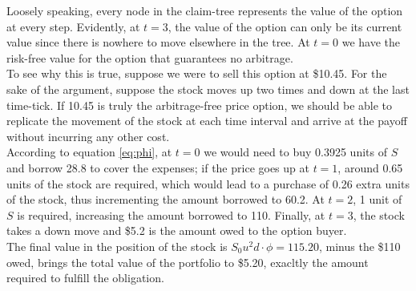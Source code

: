 \documentclass[../TGMAFFIRO.tex]{subfiles}
\begin{document}
Loosely speaking, every node in the claim-tree represents the value of the option at every step. Evidently, at $t=3$, the value of the option can only be its current value since there is nowhere to move elsewhere in the tree. At $t=0$ we have the risk-free value for the option that guarantees no arbitrage.\\

To see why this is true, suppose we were to sell this option at \$10.45. For the sake of the argument, suppose the stock moves up two times and down at the last time-tick. If 10.45 is truly the arbitrage-free price option, we should be able to replicate the movement of the stock at each time interval and arrive at the payoff without incurring any other cost.\\

According to equation \ref{eq:phi}, at $t=0$ we would need to buy 0.3925 units of $S$ and borrow 28.8 to cover the expenses; if the price goes up at $t=1$, around 0.65 units of the stock are required, which would lead to a purchase of 0.26 extra units of the stock, thus incrementing the amount borrowed to 60.2. At $t=2$, 1 unit of $S$ is required, increasing the amount borrowed to 110. Finally, at $t=3$, the stock takes a down move and \$5.2 is the amount owed to the option buyer. \\

The final value in the position of the stock is $S_0 u ^ 2 d \cdot \phi = 115.20$, minus the \$110 owed, brings the total value of the portfolio to \$5.20, exacltly the amount required to fulfill the obligation.
\end{document}
